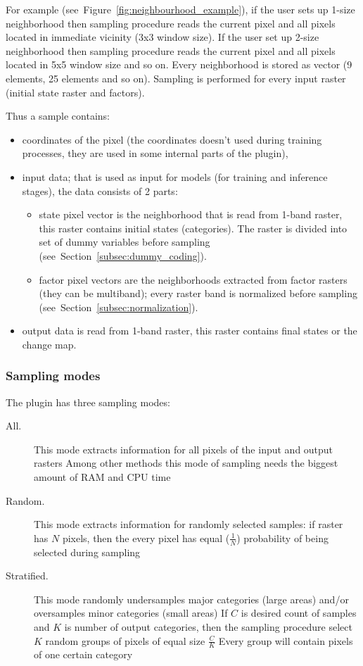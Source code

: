 \documentclass{report}
\begin{document}
For example (see~Figure~\ref{fig:neighbourhood_example}), if the user sets up 1-size neighborhood then sampling procedure reads the current pixel and all pixels located in immediate vicinity (3x3 window size). If the user set up 2-size neighborhood then sampling procedure reads the current pixel and all pixels located in 5x5 window size and so on. Every neighborhood is stored as vector (9 elements, 25 elements and so on). Sampling is performed for every input raster (initial state raster and factors).

Thus a sample contains:
\begin{itemize}
    \item coordinates of the pixel (the coordinates doesn't used during training processes, they are used in some internal parts of the plugin),
    \item input data; that is used as input for models (for training and inference stages), the data consists of 2 parts:
      \begin{itemize}
      \item state pixel vector is the neighborhood that is read from 1-band raster, this raster contains initial states (categories). The raster is divided into set of dummy variables before sampling (see~Section~\ref{subsec:dummy_coding}).
        \item factor pixel vectors are the neighborhoods extracted from factor rasters (they can be multiband); every raster band is normalized before sampling (see~Section~\ref{subsec:normalization}).
      \end{itemize}
    \item output data is read from 1-band raster, this raster contains final states or the change map.
\end{itemize}

\subsubsection{Sampling modes}\label{subsec:sampling_modes}
The plugin has three sampling modes:
\begin{description}
    \item[All.] This mode extracts information for all pixels of the input and output rasters Among other methods this mode of sampling needs the biggest amount of RAM and CPU time
    \item[Random.] This mode extracts information for randomly selected samples: if raster has $N$ pixels, then the every pixel has equal ($\frac1N$) probability of being selected during sampling
    \item[Stratified.] This mode randomly undersamples major categories (large areas) and/or oversamples minor categories (small areas) If $C$ is desired count of samples and $K$ is number of output categories, then the sampling procedure select $K$ random groups of pixels of equal size $\frac{C}{K}$ Every group will contain pixels of one certain category
\end{description}
\end{document}
